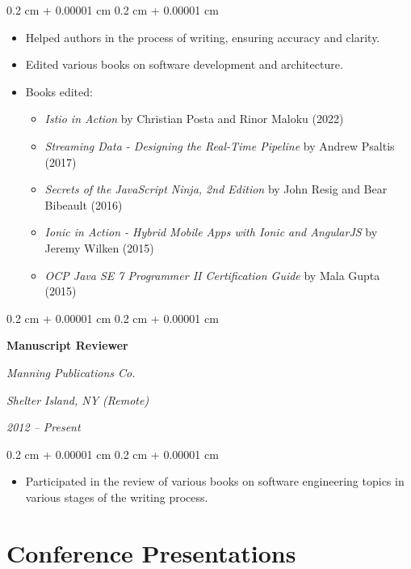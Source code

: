 \documentclass[10pt, a4paper]{article}
\newenvironment{highlights}{
    \begin{itemize}[
        topsep=0.10 cm,
        parsep=0.10 cm,
        partopsep=0pt,
        itemsep=0pt,
        leftmargin=0.4 cm + 10pt
    ]
}{
    \end{itemize}
} %
\newenvironment{onecolentry}{
    \begin{adjustwidth}{
        0.2 cm + 0.00001 cm
    }{
        0.2 cm + 0.00001 cm
    }
}{
    \end{adjustwidth}
} %
\newenvironment{twocolentry}[2][]{
    \onecolentry
    \def\secondColumn{#2}
    \setcolumnwidth{\fill, 8 cm}
    \begin{paracol}{2}
}{
    \switchcolumn \raggedleft \secondColumn
    \end{paracol}
    \endonecolentry
} %
\begin{document}
\vspace{0.10 cm}
\begin{onecolentry}
    \begin{highlights}
        \item Helped authors in the process of writing, ensuring accuracy and clarity.
        \item Edited various books on software development and architecture.
        \item Books edited:
        \begin{itemize}[leftmargin=0.5cm, topsep=0.0cm, itemsep=0.02cm]
            \item \textit{Istio in Action} by Christian Posta and Rinor Maloku (2022)
            \item \textit{Streaming Data - Designing the Real-Time Pipeline} by Andrew Psaltis (2017)
            \item \textit{Secrets of the JavaScript Ninja, 2nd Edition} by John Resig and Bear Bibeault (2016)
            \item \textit{Ionic in Action - Hybrid Mobile Apps with Ionic and AngularJS} by Jeremy Wilken (2015)
            \item \textit{OCP Java SE 7 Programmer II Certification Guide} by Mala Gupta (2015)
        \end{itemize}
    \end{highlights}
\end{onecolentry}

\vspace{0.20 cm}

\begin{twocolentry}{
        \textit{Shelter Island, NY (Remote)}

        \textit{2012 – Present}}
    \textbf{Manuscript Reviewer}

    \textit{Manning Publications Co.}
\end{twocolentry}

\vspace{0.10 cm}
\begin{onecolentry}
    \begin{highlights}
        \item Participated in the review of various books on software engineering topics in various stages of the writing process.
    \end{highlights}
\end{onecolentry}



\section{Conference Presentations}
\end{document}
